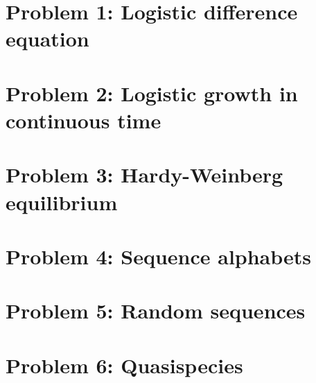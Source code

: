 \newcommand{\package}{\emph}

\setcounter{chapter}{1}
\setcounter{section}{0}
\section{Problem 1: Logistic difference equation}

\setcounter{chapter}{2}
\setcounter{section}{0}
\section{Problem 2: Logistic growth in continuous time}

\setcounter{chapter}{3}
\setcounter{section}{0}
\section{Problem 3: Hardy-Weinberg equilibrium}

\setcounter{chapter}{4}
\setcounter{section}{0}
\section{Problem 4: Sequence alphabets}

\setcounter{chapter}{5}
\setcounter{section}{0}
\section{Problem 5: Random sequences}

\setcounter{chapter}{6}
\setcounter{section}{0}
\section{Problem 6: Quasispecies}